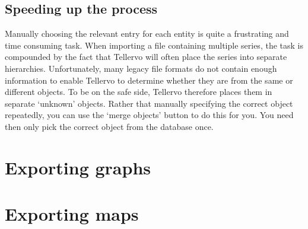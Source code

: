 \subsection{Speeding up the process}
Manually choosing the relevant entry for each entity is quite a frustrating and time consuming task.  When importing a file containing multiple series, the task is compounded by the fact that Tellervo will often place the series into separate hierarchies.  Unfortunately, many legacy file formats do not contain enough information to enable Tellervo to determine whether they are from the same or different objects.  To be on the safe side, Tellervo therefore places them in separate `unknown' objects.  Rather that manually specifying the correct object repeatedly, you can use the `merge objects' button to do this for you.  You need then only pick the correct object from the database once.



\section{Exporting graphs}



\section{Exporting maps}


